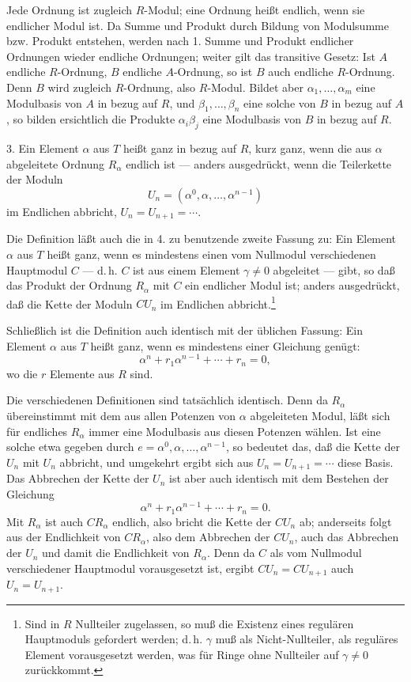 \documentclass[11pt]{article}
\begin{document}
Jede Ordnung ist zugleich $R$-Modul; eine Ordnung heißt endlich, wenn sie
endlicher Modul ist. Da Summe und Produkt durch Bildung von Modulsumme
bzw. Produkt entstehen, werden nach 1. Summe und Produkt endlicher Ordnungen
wieder endliche Ordnungen; weiter gilt das transitive Gesetz: Ist $A$ endliche
$R$-Ordnung, $B$ endliche $A$-Ordnung, so ist $B$ auch endliche $R$-Ordnung.
Denn $B$ wird zugleich $R$-Ordnung, also $R$-Modul. Bildet aber
$\alpha_1,\ldots,\alpha_m$ eine Modulbasis von $A$ in bezug auf $R$, und
$\beta_1,\ldots,\beta_n$ eine solche von $B$ in bezug auf $A$, so bilden
ersichtlich die Produkte $\alpha_i\beta_j$ eine Modulbasis von $B$ in bezug auf $R$.

3. Ein Element $\alpha$ aus $T$ heißt ganz in bezug auf $R$, kurz ganz, wenn die
aus $\alpha$ abgeleitete Ordnung $R_\alpha$ endlich ist — anders ausgedrückt, wenn
die Teilerkette der Moduln
\[
        U_n=(\alpha^0,\alpha,\ldots,\alpha^{n-1})
\]
im Endlichen abbricht, $U_n=U_{n+1}=\cdots$.

Die Definition läßt auch die in 4. zu benutzende zweite Fassung zu: Ein Element
$\alpha$ aus $T$ heißt ganz, wenn es mindestens einen vom Nullmodul verschiedenen
Hauptmodul $C$ — d.\,h. $C$ ist aus einem Element $\gamma\ne0$ abgeleitet — gibt,
so daß das Produkt der Ordnung $R_\alpha$ mit $C$ ein endlicher Modul ist; anders
ausgedrückt, daß die Kette der Moduln $CU_n$ im Endlichen abbricht.\footnote{Sind
in $R$ Nullteiler zugelassen, so muß die Existenz eines regulären Hauptmoduls
gefordert werden; d.\,h. $\gamma$ muß als Nicht-Nullteiler, als reguläres Element
vorausgesetzt werden, was für Ringe ohne Nullteiler auf $\gamma\ne0$ zurückkommt.}

Schließlich ist die Definition auch identisch mit der üblichen Fassung: Ein Element
$\alpha$ aus $T$ heißt ganz, wenn es mindestens einer Gleichung genügt:
\[
        \alpha^n+r_1\alpha^{n-1}+\cdots+r_n=0,
\]
wo die $r$ Elemente aus $R$ sind.

Die verschiedenen Definitionen sind tatsächlich identisch. Denn da $R_\alpha$
übereinstimmt mit dem aus allen Potenzen von $\alpha$ abgeleiteten Modul, läßt
sich für endliches $R_\alpha$ immer eine Modulbasis aus diesen Potenzen wählen.
Ist eine solche etwa gegeben durch $e=\alpha^0,\alpha,\ldots,\alpha^{n-1}$, so
bedeutet das, daß die Kette der $U_n$ mit $U_n$ abbricht, und umgekehrt ergibt
sich aus $U_n=U_{n+1}=\cdots$ diese Basis. Das Abbrechen der Kette der $U_n$
ist aber auch identisch mit dem Bestehen der Gleichung
\[
        \alpha^n+r_1\alpha^{n-1}+\cdots+r_n=0.
\]
Mit $R_\alpha$ ist auch $CR_\alpha$ endlich, also bricht die Kette der $CU_n$ ab;
anderseits folgt aus der Endlichkeit von $CR_\alpha$, also dem Abbrechen der
$CU_n$, auch das Abbrechen der $U_n$ und damit die Endlichkeit von $R_\alpha$.
Denn da $C$ als vom Nullmodul verschiedener Hauptmodul vorausgesetzt ist,
ergibt $CU_n=CU_{n+1}$ auch $U_n=U_{n+1}$.
\end{document}
